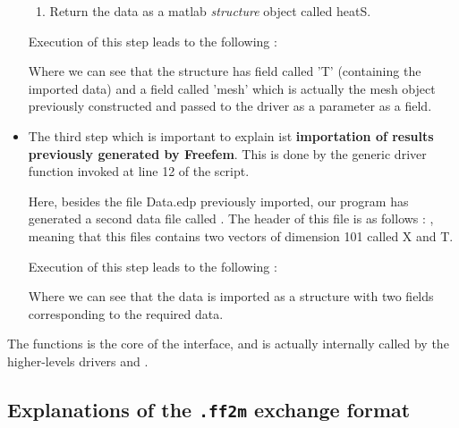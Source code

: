 \begin{itemize}
\begin{enumerate}
\item Return the data as a matlab {\em structure} object called {\sf heatS}.
\end{enumerate}

Execution of this step leads to the following :


Where we can see that the structure has field called 'T' (containing the imported data)
 and a field called 'mesh'  which is actually the mesh object previously constructed and passed to the driver as a parameter as a field.


\item The third step which is important to explain ist {\bf importation of results previously generated by Freefem}. 
This is done by the generic driver function  invoked at line 12 of the script. 

Here, besides the file Data.edp previously imported, our program has generated a second data file called .
The header of this file is as follows :
, 
meaning that this files contains two vectors of dimension 101 called X and T.


Execution of this step leads to the following :



Where we can see that the data is imported as a structure with two fields corresponding to the required data.

\end{itemize}

The  functions is the core of the interface, and is actually internally called by the higher-levels drivers   and .

 


%


%

\subsection{Explanations of the \texttt{.ff2m} exchange format}


